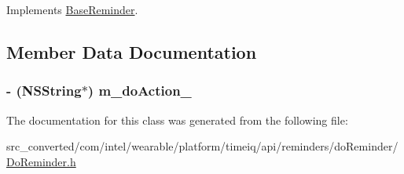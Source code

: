 Implements \hyperlink{interface_base_reminder_a70c1501567218c45cc3574a15af85773}{Base\+Reminder}.



\subsection{Member Data Documentation}
\hypertarget{interface_do_reminder_ac817c492031de1a60bbaaa7289ecce82}{}
\subsubsection[{m\+\_\+do\+Action\+\_\+}]{\setlength{\rightskip}{0pt plus 5cm}-\/ (N\+S\+String$\ast$) m\+\_\+do\+Action\+\_\+}\label{interface_do_reminder_ac817c492031de1a60bbaaa7289ecce82}


The documentation for this class was generated from the following file\+:\begin{DoxyCompactItemize}
\item 
src\+\_\+converted/com/intel/wearable/platform/timeiq/api/reminders/do\+Reminder/\hyperlink{_do_reminder_8h}{Do\+Reminder.\+h}\end{DoxyCompactItemize}
